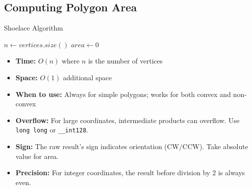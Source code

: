 
\subsection{Computing Polygon Area}

\begin{algorithm}[H]
\caption{Shoelace Algorithm}
$n \gets vertices.size()$\;
$area \gets 0$\;
\end{algorithm}

\begin{complexity}
\begin{itemize}
\item \textbf{Time:} $O(n)$ where $n$ is the number of vertices
\item \textbf{Space:} $O(1)$ additional space
\item \textbf{When to use:} Always for simple polygons; works for both convex and non-convex
\end{itemize}
\end{complexity}

\begin{implementation}
\begin{tipsbox}
\begin{itemize}
\item \textbf{Overflow:} For large coordinates, intermediate products can overflow. Use \texttt{long long} or \texttt{\_\_int128}.
\item \textbf{Sign:} The raw result's sign indicates orientation (CW/CCW). Take absolute value for area.
\item \textbf{Precision:} For integer coordinates, the result before division by 2 is always even.
\end{itemize}
\end{tipsbox}
\end{implementation} 